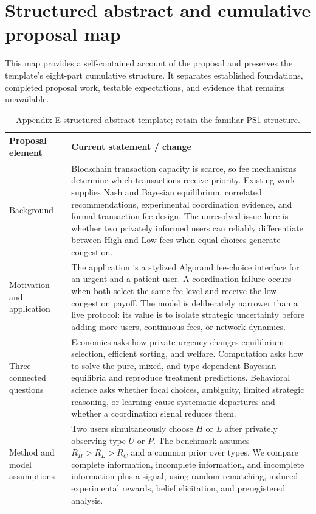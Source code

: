 \section{Structured abstract and cumulative proposal map}
This map provides a self-contained account of the proposal and preserves the template's eight-part cumulative structure. It separates established foundations, completed proposal work, testable expectations, and evidence that remains unavailable.
\begin{table}[H]
\caption{Appendix E structured abstract template; retain the familiar PS1 structure.}
\label{tab:abstract-map}
\renewcommand{\arraystretch}{1.18}
\begin{tabularx}{\textwidth}{@{}p{}Y@{}}
\toprule
\textbf{Proposal element}&\textbf{Current statement / change}\\\midrule
Background&Blockchain transaction capacity is scarce, so fee mechanisms determine which transactions receive priority. Existing work supplies Nash and Bayesian equilibrium, correlated recommendations, experimental coordination evidence, and formal transaction-fee design. The unresolved issue here is whether two privately informed users can reliably differentiate between High and Low fees when equal choices generate congestion.\\
Motivation and application&The application is a stylized Algorand fee-choice interface for an urgent and a patient user. A coordination failure occurs when both select the same fee level and receive the low congestion payoff. The model is deliberately narrower than a live protocol: its value is to isolate strategic uncertainty before adding more users, continuous fees, or network dynamics.\\
Three connected questions&Economics asks how private urgency changes equilibrium selection, efficient sorting, and welfare. Computation asks how to solve the pure, mixed, and type-dependent Bayesian equilibria and reproduce treatment predictions. Behavioral science asks whether focal choices, ambiguity, limited strategic reasoning, or learning cause systematic departures and whether a coordination signal reduces them.\\
Method and model assumptions&Two users simultaneously choose $H$ or $L$ after privately observing type $U$ or $P$. The benchmark assumes $R_H>R_L>R_C$ and a common prior over types. We compare complete information, incomplete information, and incomplete information plus a signal, using random rematching, induced experimental rewards, belief elicitation, and preregistered analysis.\\

\end{tabularx}
\end{table}
